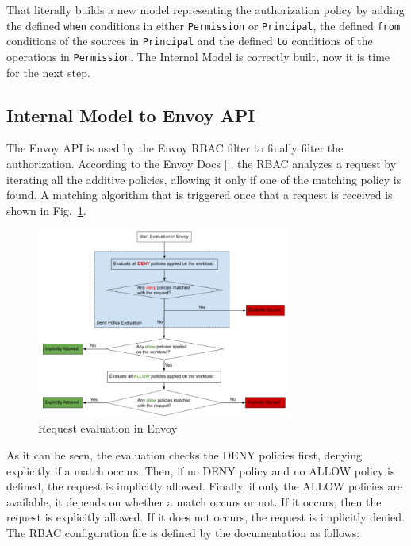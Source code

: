 \noindent That literally builds a new model representing the authorization policy by adding the defined \texttt{when} conditions in either \texttt{Permission} or \texttt{Principal}, the defined \texttt{from} conditions of the sources in \texttt{Principal} and the defined \texttt{to} conditions of the operations in \texttt{Permission}. The Internal Model is correctly built, now it is time for the next step.

\newpage

\subsection{Internal Model to Envoy API}
The Envoy API is used by the Envoy RBAC filter to finally filter the authorization. According to the Envoy Docs [], the RBAC analyzes a request by iterating all the additive policies, allowing it only if one of the matching policy is found. A matching algorithm that is triggered once that a request is received is shown in Fig.~\ref{fig:env-eval}.

\begin{figure}[ht]
    \centering
    \includegraphics[width=0.75\textwidth]{chapters/images/chp3/env-eval.png}
    \caption{Request evaluation in Envoy}
    \label{fig:env-eval}
\end{figure}

\noindent As it can be seen, the evaluation checks the DENY policies first, denying explicitly if a match occurs. Then, if no DENY policy and no ALLOW policy is defined, the request is implicitly allowed. Finally, if only the ALLOW policies are available, it depends on whether a match occurs or not. If it occurs, then the request is explicitly allowed. If it does not occurs, the request is implicitly denied.
The RBAC configuration file is defined by the documentation \cite{v2api} as follows:


